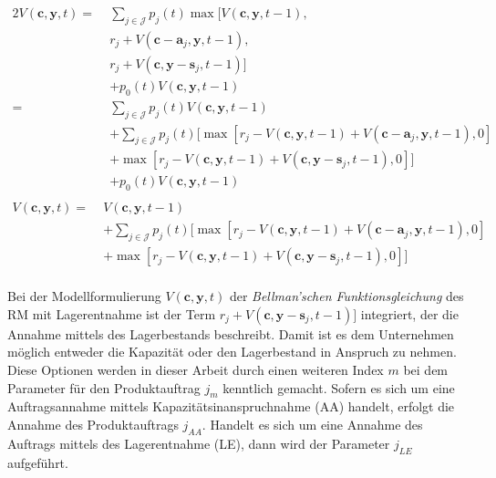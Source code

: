 \begin{alignat*}{2}
V(\textbf{c}, \textbf{y}, t) =\;& \sum_{j \in \mathcal{J}}p_{j}(t)\max[V(\textbf{c}, \textbf{y}, t-1), \\
& r_{j} + V(\textbf{c}-\textbf{a}_j, \textbf{y}, t-1),\\
& r_{j} + V(\textbf{c}, \textbf{y}-\textbf{s}_j, t-1)] \\
& + p_{0}(t)V(\textbf{c}, \textbf{y}, t-1)\\[10pt] 
= \;& \sum_{j \in \mathcal{J}}p_{j}(t)V(\textbf{c}, \textbf{y}, t-1)\\
&+ \sum_{j \in \mathcal{J}}p_{j}(t)[\max[r_{j} - V(\textbf{c}, \textbf{y}, t-1)+ V(\textbf{c}-\textbf{a}_j, \textbf{y}, t-1),0]\\
&+ \max[r_{j} - V(\textbf{c}, \textbf{y}, t-1) + V(\textbf{c}, \textbf{y}-\textbf{s}_j, t-1),0]]\\
&+ p_{0}(t)V(\textbf{c}, \textbf{y}, t-1)\\
\end{alignat*}
\begin{equation}\label{stock}
\begin{alignat*}{2}
V(\textbf{c}, \textbf{y}, t) = \;& V(\textbf{c}, \textbf{y}, t-1)\\
&+ \sum_{j \in \mathcal{J}}p_{j}(t)[\max[r_{j} - V(\textbf{c}, \textbf{y}, t-1) + V(\textbf{c}-\textbf{a}_j, \textbf{y}, t-1),0]\\
&+ \max[r_{j} - V(\textbf{c}, \textbf{y}, t-1) + V(\textbf{c}, \textbf{y}-\textbf{s}_j, t-1),0]]\\
\end{alignat*}
\end{equation}

Bei der Modellformulierung $V(\textbf{c}, \textbf{y}, t)$ der \textit{Bellman'schen Funktionsgleichung} des RM mit Lagerentnahme ist der Term $ r_{j} + V(\textbf{c}, \textbf{y}-\textbf{s}_j, t-1)]$ integriert, der die Annahme mittels des Lagerbestands beschreibt. Damit ist es dem Unternehmen möglich entweder die Kapazität oder den Lagerbestand in Anspruch zu nehmen. Diese Optionen werden in dieser Arbeit durch einen weiteren Index $m$ bei dem Parameter für den Produktauftrag $j_{m}$ kenntlich gemacht. Sofern es sich um eine Auftragsannahme mittels Kapazitätsinanspruchnahme (AA) handelt, erfolgt die Annahme des Produktauftrags $j_{AA}$. Handelt es sich um eine Annahme des Auftrags mittels des Lagerentnahme (LE), dann wird der Parameter $j_{LE}$ aufgeführt.

